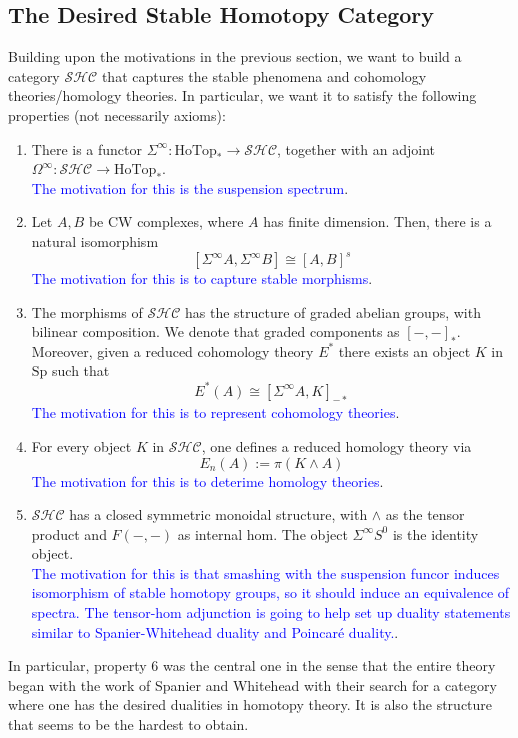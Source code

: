\documentclass{article}
\theoremstyle{definition}
\theoremstyle{definition}
\theoremstyle{definition}
\theoremstyle{definition}
\theoremstyle{definition}
\theoremstyle{definition}
\theoremstyle{definition}
\begin{document}
\subsection{The Desired Stable Homotopy Category}
Building upon the motivations in the previous section, we want to build a category $\mathcal{SHC}$ that captures the stable phenomena and cohomology theories/homology theories. In particular, we want it to satisfy the following properties (not necessarily axioms):
\begin{enumerate}
    \item There is a functor $\Sigma^{\infty}: \textrm{HoTop}_*\to \mathcal{SHC}$, together with an adjoint $\Omega^{\infty}: \mathcal{SHC}\to \textrm{HoTop}_*$. \\
    \textcolor{blue}{The motivation for this is the suspension spectrum}.
    \item Let $A,B$ be CW complexes, where $A$ has finite dimension. Then, there is a natural isomorphism
    \[[\Sigma^{\infty}A, \Sigma^{\infty}B]\cong [A,B]^s\]
    \textcolor{blue}{The motivation for this is to capture stable morphisms}.
    \item The morphisms of $\mathcal{SHC}$ has the structure of graded abelian groups, with bilinear composition. We denote that graded components as $[-,-]_*$. Moreover, given a reduced cohomology theory $E^*$ there exists an object $K$ in $\textrm{Sp}$ such that 
    \[E^*(A)\cong [\Sigma^{\infty}A, K]_{-*}\]
    \textcolor{blue}{The motivation for this is to represent cohomology theories}.\\
    \item For every object $K$ in $\mathcal{SHC}$, one defines a reduced homology theory via 
    \[E_n(A):=\pi(K\wedge A)\]
    \textcolor{blue}{The motivation for this is to deterime homology theories}.
    \\
    \item $\mathcal{SHC}$ has a closed symmetric monoidal structure, with $\wedge$ as the tensor product and $F(-,-)$ as internal hom. The object $\Sigma^{\infty}S^0$ is the identity object.\\
    \textcolor{blue}{The motivation for this is that smashing with the suspension funcor induces isomorphism of stable homotopy groups, so it should induce an equivalence of spectra. The tensor-hom adjunction is going to help set up duality statements similar to Spanier-Whitehead duality and Poincar\'e duality.}.
\end{enumerate}
In particular, property $6$ was the central one in the sense that the entire theory began with the work of Spanier and Whitehead with their search for a category where one has the desired dualities in homotopy theory. It is also the structure that seems to be the hardest to obtain.  
\end{document}
